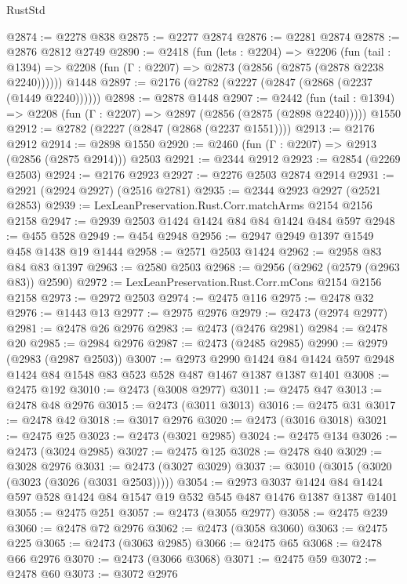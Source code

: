 \begin{lexlean}{RustStd}
\begin{coremodule}
{\begin{coremodule}
{{{{{{{{{{@2874 := @2278 @838
@2875 := @2277 @2874
@2876 := @2281 @2874
@2878 := @2876 @2812 @2749
@2890 := @2418
    (fun (lets : @2204) =>
    @2206
      (fun (tail : @1394) => @2208 (fun (Γ : @2207) => @2873 (@2856 (@2875 (@2878 @2238 @2240))))))
    @1448
@2897 := @2176 (@2782 (@2227 (@2847 (@2868 (@2237 (@1449 @2240))))))
@2898 := @2878 @1448
@2907 := @2442
    (fun (tail : @1394) => @2208 (fun (Γ : @2207) => @2897 (@2856 (@2875 (@2898 @2240)))))
    @1550
@2912 := @2782 (@2227 (@2847 (@2868 (@2237 @1551))))
@2913 := @2176 @2912
@2914 := @2898 @1550
@2920 := @2460 (fun (Γ : @2207) => @2913 (@2856 (@2875 @2914))) @2503
@2921 := @2344 @2912
@2923 := @2854 (@2269 @2503)
@2924 := @2176 @2923
@2927 := @2276 @2503 @2874 @2914
@2931 := @2921 (@2924 @2927) (@2516 @2781)
@2935 := @2344 @2923 @2927 (@2521 @2853)
@2939 := LexLeanPreservation.Rust.Corr.matchArms @2154 @2156 @2158
@2947 := @2939 @2503 @1424 @1424 @84 @84 @1424 @484 @597
@2948 := @455 @528
@2949 := @454 @2948
@2956 := @2947 @2949 @1397 @1549 @458 @1438 @19 @1444
@2958 := @2571 @2503 @1424
@2962 := @2958 @83 @84 @83 @1397
@2963 := @2580 @2503
@2968 := @2956 (@2962 (@2579 (@2963 @83)) @2590)
@2972 := LexLeanPreservation.Rust.Corr.mCons @2154 @2156 @2158
@2973 := @2972 @2503
@2974 := @2475 @116
@2975 := @2478 @32
@2976 := @1443 @13
@2977 := @2975 @2976
@2979 := @2473 (@2974 @2977)
@2981 := @2478 @26 @2976
@2983 := @2473 (@2476 @2981)
@2984 := @2478 @20
@2985 := @2984 @2976
@2987 := @2473 (@2485 @2985)
@2990 := @2979 (@2983 (@2987 @2503))
@3007 := @2973
    @2990
    @1424
    @84
    @1424
    @597
    @2948
    @1424
    @84
    @1548
    @83
    @523
    @528
    @487
    @1467
    @1387
    @1387
    @1401
@3008 := @2475 @192
@3010 := @2473 (@3008 @2977)
@3011 := @2475 @47
@3013 := @2478 @48 @2976
@3015 := @2473 (@3011 @3013)
@3016 := @2475 @31
@3017 := @2478 @42
@3018 := @3017 @2976
@3020 := @2473 (@3016 @3018)
@3021 := @2475 @25
@3023 := @2473 (@3021 @2985)
@3024 := @2475 @134
@3026 := @2473 (@3024 @2985)
@3027 := @2475 @125
@3028 := @2478 @40
@3029 := @3028 @2976
@3031 := @2473 (@3027 @3029)
@3037 := @3010 (@3015 (@3020 (@3023 (@3026 (@3031 @2503)))))
@3054 := @2973
    @3037
    @1424
    @84
    @1424
    @597
    @528
    @1424
    @84
    @1547
    @19
    @532
    @545
    @487
    @1476
    @1387
    @1387
    @1401
@3055 := @2475 @251
@3057 := @2473 (@3055 @2977)
@3058 := @2475 @239
@3060 := @2478 @72 @2976
@3062 := @2473 (@3058 @3060)
@3063 := @2475 @225
@3065 := @2473 (@3063 @2985)
@3066 := @2475 @65
@3068 := @2478 @66 @2976
@3070 := @2473 (@3066 @3068)
@3071 := @2475 @59
@3072 := @2478 @60
@3073 := @3072 @2976
}}}}}}}}}}
\end{coremodule}}
\end{coremodule}
\end{lexlean}
